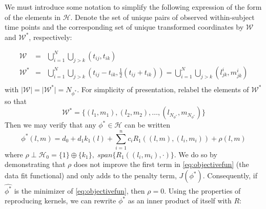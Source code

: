 We must introduce some notation to simplify the following expression of the form of the elements in $\mathcal{H}$. Denote the set of unique pairs of observed within-subject time points and the corresponding set of unique transformed coordinates by $\mathcal{W}$ and $\mathcal{W}^*$, respectively:

\begin{eqnarray*}
\mathcal{W} &=& \bigcup_{i=1}^N \bigcup_{j>k}\left(t_{ij} ,t_{ik} \right)\\
\mathcal{W}^* &=& \bigcup_{i=1}^N \bigcup_{j>k}\left(t_{ij}-t_{ik} ,\frac{1}{2}\left( t_{ij}+t_{ik} \right) \right) = \bigcup_{i=1}^N \bigcup_{j>k}\left(l^i_{jk},m^i_{jk} \right)\\
\end{eqnarray*}
\noindent
with $\vert \mathcal{W}\vert = \vert \mathcal{W}^* \vert = N_{\phi^*}$. For simplicity of presentation, relabel the elements of $\mathcal{W}^*$ so that 
\[
\mathcal{W}^* = \lbrace \left( l_1,m_1 \right), \left( l_2,m_2 \right), \dots, \left( l_{N_{\phi^*}},m_{N_{\phi^*}} \right)  \rbrace
\]
\noindent
Then we may verify that any $\phi^* \in \mathcal{H}$ can be written 
\[
\phi^*\left(l,m \right) = d_0 + d_1k_1\left(l\right) + \sum_{i=1}^n  c_i R_1\left( \left(l,m\right) , \left(l_i,m_i \right)\right) + \rho\left(l,m\right)
\]
\noindent
where $\rho \perp \mathcal{H}_0 = \lbrace 1\rbrace \oplus \lbrace k_1\rbrace,\; span\lbrace R_1\left(\left(l_i, m_i \right),\cdot \right)  \rbrace$. We do so by demonstrating that  $\rho$ does not improve the first term in \eqref{eq:objectivefun} (the data fit functional) and only adds to the penalty term, $J\left(\phi^*\right)$. Consequently, if $\hat{\phi^*}$ is the minimizer of \eqref{eq:objectivefun}, then $\rho = 0$. Using the properties of reproducing kernels, we can rewrite $\phi^*$ as an inner product of itself with $R$:
 
